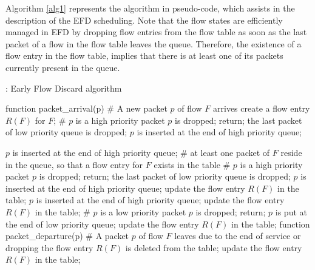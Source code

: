 \documentclass[preprint,12pt]{elsarticle}
\begin{document}
Algorithm \ref{alg1} represents the algorithm in pseudo-code, which assists in the description of the EFD scheduling. Note that the flow states are efficiently managed in EFD by dropping flow entries from the flow table as soon as the last packet of a flow in the flow table leaves the queue. Therefore, the existence of a flow entry in the flow table, implies that there is at least one of its packets currently present in the queue. 

\begin{algorithm}
\scriptsize
\caption{: Early Flow Discard algorithm}
\label{alg1}
\begin{algorithmic}[1]
\STATE function packet\_arrival(p)
\STATE \# A new packet $p$ of flow $F$ arrives
\STATE create a flow entry $R(F)$ for $F$;
\STATE \# $p$ is a high priority packet
\STATE $p$ is dropped;
\STATE return;
\ELSE
\STATE the last packet of low priority queue is dropped;
\STATE $p$ is inserted at the end of high priority queue;
\ENDIF

\ELSE
\STATE $p$ is inserted at the end of high priority queue;
\ENDIF
\ELSE
\STATE \# at least one packet of $F$ reside in the queue, so that a flow entry for $F$ exists in the table
\STATE \# $p$ is a high priority packet
\STATE $p$ is dropped;
\STATE return;
\ELSE
\STATE the last packet of low priority queue is dropped;
\STATE $p$ is inserted at the end of high priority queue;
\STATE update the flow entry $R(F)$ in the table;
\ENDIF
\ELSE
\STATE $p$ is inserted at the end of high priority queue;
\STATE update the flow entry $R(F)$ in the table;
\ENDIF
\ELSE
\STATE \# $p$ is a low priority packet
\STATE $p$ is dropped;
\STATE return;
\ELSE
\STATE $p$ is put at the end of low priority queue;
\STATE update the flow entry $R(F)$ in the table;
\ENDIF
\ENDIF
\ENDIF
\STATE
\STATE function packet\_departure(p)
\STATE \# A packet $p$ of flow $F$ leaves due to the end of service or dropping 
\STATE the flow entry $R(F)$ is deleted from the table;
\ELSE
\STATE update the flow entry $R(F)$ in the table;
\ENDIF

\end{algorithmic}
\end{algorithm}
\end{document}
